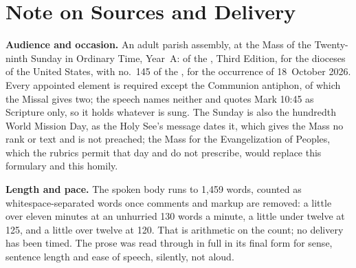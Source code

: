 
\section*{Note on Sources and Delivery}

{\small

\textbf{Audience and occasion.} An adult parish assembly, at the Mass of the
Twenty-ninth Sunday in Ordinary Time, Year~A:  of the , Third Edition, for the dioceses of the
United States, with no.~145 of the , for the
occurrence of 18~October 2026. Every appointed element is required except the
Communion antiphon, of which the Missal gives two; the speech names neither
and quotes Mark 10:45 as Scripture only, so it holds whatever is sung. The
Sunday is also the hundredth World Mission Day, as the Holy See's message
dates it, which gives the Mass no rank or text and is not preached; the Mass
for the Evangelization of Peoples, which the rubrics permit that day and do
not prescribe, would replace this formulary and this homily.

\textbf{Length and pace.} The spoken body runs to 1,459 words, counted as
whitespace-separated words once comments and markup are removed: a little over
eleven minutes at an unhurried 130 words a minute, a little under twelve at
125, and a little over twelve at 120. That is arithmetic on the count; no
delivery has been timed. The prose was read through in full in its final form
for sense, sentence length and ease of speech, silently, not aloud.

}
